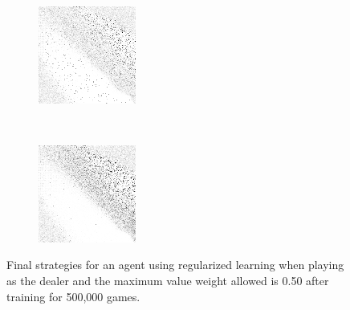 \begin{figure}
\begin{subfigure}[t]{0.22\textwidth}
		\caption{\peggingmaxavggained}
	\end{subfigure}
~
	\begin{subfigure}[t]{0.22\textwidth}
		\center
		\includegraphics[width=\textwidth]{images/findings/experiments/regularization/strats/0.50/pegging_max_med_gained.png}
		\caption{\peggingmaxmedgained}
	\end{subfigure}
	~
	\begin{subfigure}[t]{0.22\textwidth}
		\center
		\includegraphics[width=\textwidth]{images/findings/experiments/regularization/strats/0.50/pegging_min_avg_given.png}
		\caption{\peggingminavggiven}
	\end{subfigure}

\caption{
	Final strategies for an agent using regularized learning
	when playing as the dealer
	and the maximum value weight allowed is 0.50
	after training for 500,000 games.
}
\label{fig:neighbor-strats}
\end{figure}
